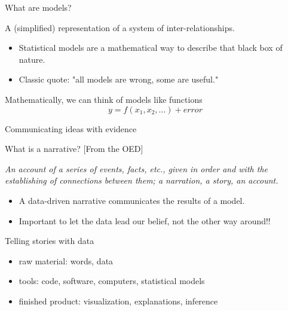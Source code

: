 \documentclass[table]{beamer}\usepackage[]{graphicx}\usepackage[]{color}
\begin{document}
\begin{frame}{What are models?}


\begin{block}{A (simplified) representation of a system of inter-relationships.}

\begin{itemize}
	\item Statistical models are a mathematical way to describe that black box of nature.
	\item Classic quote: "all models are wrong, some are useful." 
\end{itemize}

\end{block}

Mathematically, we can think of models like functions
$$ y = f(x_1, x_2, ...) + error $$


\end{frame}



\begin{frame}{Communicating ideas with evidence}

\begin{block}{What is a narrative? [From the OED]}

\em An account of a series of events, facts, etc., given in order and with the establishing of connections between them; a narration, a story, an account.

\em 
\begin{itemize}
  \item A data-driven narrative communicates the results of a model.
  \item Important to let the data lead our belief, not the other way around!!
\end{itemize}

\end{block}

\bigskip

\begin{block}{Telling stories with data}

\begin{itemize}
	\item raw material: words, data
	\item tools: code, software, computers, statistical models
	\item finished product: visualization, explanations, inference
\end{itemize}

\end{block}


\end{frame}
\end{document}
